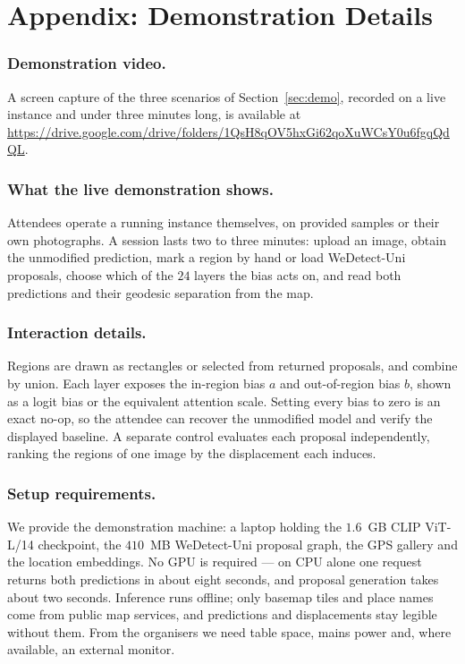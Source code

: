 \section*{Appendix: Demonstration Details}

\subsubsection*{Demonstration video.}
A screen capture of the three scenarios of Section~\ref{sec:demo}, recorded on
a live instance and under three minutes long, is available at
\url{https://drive.google.com/drive/folders/1QsH8qOV5hxGi62qoXuWCsY0u6fgqQdQL}.

\subsubsection*{What the live demonstration shows.}
Attendees operate a running instance themselves, on provided samples or their
own photographs. A session lasts two to three minutes: upload an image, obtain
the unmodified prediction, mark a region by hand or load WeDetect-Uni
proposals, choose which of the $24$ layers the bias acts on, and
read both predictions and their geodesic separation from the map.

\subsubsection*{Interaction details.}
Regions are drawn as rectangles or selected from returned proposals, and
combine by union. Each layer exposes the in-region bias $a$ and out-of-region
bias $b$, shown as a logit bias or the equivalent attention scale. Setting
every bias to zero is an exact no-op, so the attendee can recover the
unmodified model and verify the displayed baseline. A separate control
evaluates each proposal independently, ranking the regions of one image by the
displacement each induces.

\subsubsection*{Setup requirements.}
We provide the demonstration machine: a laptop holding the $1.6$~GB CLIP
ViT-L/14 checkpoint, the $410$~MB WeDetect-Uni proposal graph, the GPS gallery
and the location embeddings. No GPU is required --- on CPU alone one request
returns both predictions in about eight seconds, and proposal generation takes
about two seconds. Inference runs offline; only basemap tiles and place names
come from public map services, and predictions and displacements stay legible
without them. From the organisers we need table space, mains power and, where
available, an external monitor.

